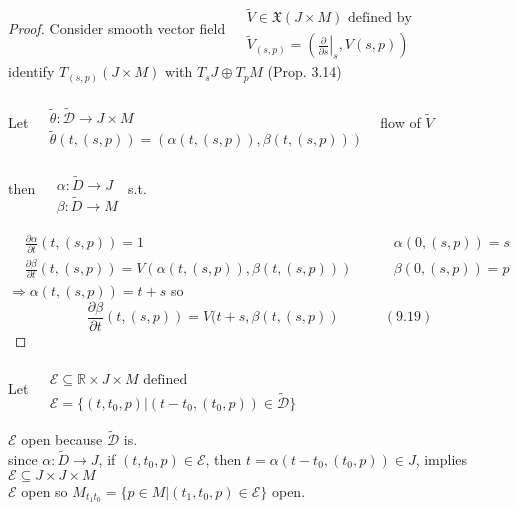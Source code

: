 \begin{proof}
Consider smooth vector field $\begin{aligned} 
& \quad  \\
  & \widetilde{V} \in \mathfrak{X}(J \times M ) \text{ defined by } \\
  & \widetilde{V}_{(s,p)} = \left( \left. \frac{ \partial }{ \partial s } \right|_s, V(s,p) \right) \end{aligned}$ \\

identify $T_{(s,p)}(J \times M)$ with $T_sJ \oplus T_pM$ (Prop. 3.14)

Let $\begin{aligned}
& \quad \\ 
  & \widetilde{\theta} : \widetilde{\mathcal{D}} \to J \times M \\
  & \widetilde{\theta}(t,(s,p)) = (\alpha(t,(s,p)) , \beta(t,(s,p)) ) \end{aligned}$ \quad \, flow of $\widetilde{V}$

then $\begin{aligned} 
 & \quad \\
  & \alpha: \widetilde{D} \to J \\
  & \beta: \widetilde{D} \to M \end{aligned}$ s.t. 

\[
\begin{aligned}
  & \frac{ \partial \alpha}{ \partial t}(t,(s,p) ) = 1 \quad \quad \, & \alpha(0,(s,p)) = s \\ 
  & \frac{ \partial \beta}{ \partial t}(t,(s,p)) = V(\alpha(t,(s,p)), \beta(t,(s,p))) \quad \quad \, & \beta(0,(s,p)) = p 
\end{aligned}
\]
$\Longrightarrow \alpha(t,(s,p)) = t+s$ so 
\begin{equation}
  \frac{ \partial \beta}{ \partial t}(t,(s,p)) = V(t+s,\beta(t,(s,p)) \quad \quad \quad \, (9.19)
\end{equation}
\end{proof}


Let $\begin{aligned}
  & \quad \\
  & \mathcal{E} \subseteq \mathbb{R} \times J \times M \text{ defined } \\
  & \mathcal{E} = \lbrace (t,t_0, p) | (t-t_0, (t_0,p) ) \in \widetilde{\mathcal{D}} \rbrace \end{aligned}$

$\mathcal{E}$ open because $\widetilde{\mathcal{D}}$ is. \\
since $\alpha: \widetilde{D} \to J$, if $(t,t_0, p) \in \mathcal{E}$, then $t= \alpha(t-t_0,(t_0,p)) \in J$, implies $\mathcal{E} \subseteq J \times J \times M$ \\
$\mathcal{E}$ open so $M_{t_1t_0} = \lbrace p \in M | (t_1,t_0, p) \in \mathcal{E} \rbrace$ open. 

